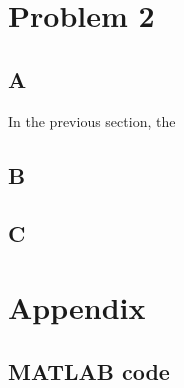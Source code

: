 \documentclass[conf]{new-aiaa}
\begin{document}
\section*{Problem 2}

\subsection*{A}
In the previous section, the 

\subsection*{B}


\subsection*{C}


\newpage
\section*{Appendix} 

\subsection*{MATLAB code} 

\begin{lstlisting}

    
	
\end{lstlisting}






% 
\end{document}

